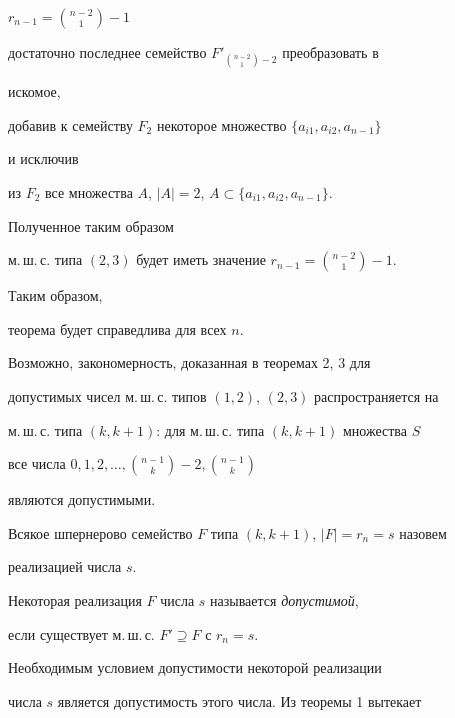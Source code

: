 \begin{pf}
$r_{n-1}=\binom{n-2}{1}-1$ 


достаточно последнее семейство $F'_{\binom{n-2}{1}-2}$ преобразовать в 


искомое, 


добавив к семейству $F_2$ некоторое множество $\{a_{i1},a_{i2},a_{n-1}\}$ 


и исключив 


из $F_2$ все множества $A$, $|A|=2$, $A\subset\{a_{i1},a_{i2},a_{n-1}\}$. 


Полученное таким образом 


м.\,ш.\,с. типа $(2,3)$ будет иметь значение $r_{n-1}=\binom{n-2}{1}-1$. 


Таким образом, 


теорема будет справедлива для всех $n$. 


\end{pf} 


 


Возможно, закономерность, доказанная в теоремах 2, 3 для 


допустимых чисел м.\,ш.\,с. типов $(1,2)$, $(2,3)$ распространяется на 


м.\,ш.\,с. типа $(k,k+1)$: для м.\,ш.\,с. типа $(k,k+1)$ множества $S$ 


все числа $0,1,2,\dotsc, \binom{n-1}{k}-2, \binom{n-1}{k}$ 


являются допустимыми. 


 


Всякое шпернерово семейство $F$ типа $(k,k+1)$, $|F|=r_n=s$ назовем 


реализацией числа $s$. 


 


 


\begin{defn} 


Некоторая реализация $F$ числа $s$ называется {\it допустимой}, 


если существует м.\,ш.\,с. $F'\supseteq F$ с $r_n=s$. 


\end{defn} 


 


Необходимым условием допустимости некоторой реализации 


числа $s$ является допустимость этого числа. Из теоремы 1 вытекает 


